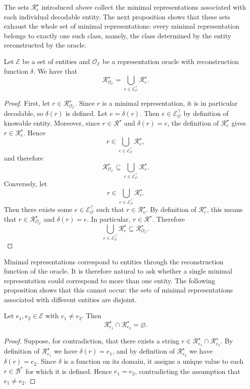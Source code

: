 The sets $\mathcal{R}^\star_{e}$ introduced above collect the minimal representations associated with each individual decodable entity. The next proposition shows that these sets exhaust the whole set of minimal representations: every minimal representation belongs to exactly one such class, namely, the class determined by the entity reconstructed by the oracle.

\begin{proposition}
Let $\mathcal{E}$ be a set of entities and $\mathcal{O}_\mathcal{E}$ be a representation oracle with reconstruction function $\delta$. We have that
\[
\mathcal{R}^{\star}_{\mathcal{O}_\mathcal{E}} = \bigcup_{e \in \mathcal{E}_{\mathcal{O}}^{\top}}\mathcal{R}^{\star}_{e}.
\]
\end{proposition}
\begin{proof}
First, let $r \in \mathcal{R}^{\star}_{\mathcal{O}_\mathcal{E}}$. Since $r$ is a minimal representation, it is in particular decodable, so $\delta(r)$ is defined. Let $e=\delta(r)$. Then $e\in\mathcal{E}_{\mathcal{O}}^{\top}$ by definition of knowable entity. Moreover, since $r \in \mathcal{R}^{\star}$ and $\delta(r)=e$, the definition of $\mathcal{R}^{\star}_{e}$ gives $r \in \mathcal{R}^{\star}_{e}$. Hence
\[
r\in \bigcup_{e\in\mathcal{E}_{\mathcal{O}}^{\top}}\mathcal{R}^{\star}_{e},
\]
and therefore
\[
\mathcal{R}^{\star}_{\mathcal{O}_\mathcal{E}} \subseteq \bigcup_{e\in\mathcal{E}_{\mathcal{O}}^{\top}}\mathcal{R}^{\star}_{e}.
\]
Conversely, let
\[
r\in \bigcup_{e\in\mathcal{E}_{\mathcal{O}}^{\top}}\mathcal{R}^{\star}_{e}.
\]
Then there exists some $e \in \mathcal{E}_{\mathcal{O}}^{\top}$ such that $r\in\mathcal{R}^{\star}_{e}$. By definition of $\mathcal{R}^{\star}_{e}$, this means that $r\in\mathcal{R}^{\star}_{\mathcal{O}_\mathcal{E}}$ and $\delta(r)=e$. In particular, $r\in\mathcal{R}^{\star}$. Therefore
\[
\bigcup_{e\in\mathcal{E}_{\mathcal{O}}^{\top}}\mathcal{R}^{\star}_{e}\subseteq \mathcal{R}^{\star}_{\mathcal{O}_\mathcal{E}}.
\]
\end{proof}

Minimal representations correspond to entities through the reconstruction function of the oracle. It is therefore natural to ask whether a single minimal representation could correspond to more than one entity. The following proposition shows that this cannot occur: the sets of minimal representations associated with different entities are disjoint.

\begin{proposition}
Let $e_1,e_2 \in \mathcal{E}$ with $e_1 \neq e_2$. Then
\[
\mathcal{R}^\star_{e_1} \cap \mathcal{R}^\star_{e_2} = \varnothing .
\]
\end{proposition}
\begin{proof}
Suppose, for contradiction, that there exists a string $r \in \mathcal{R}^\star_{e_1} \cap \mathcal{R}^\star_{e_2}$. By definition of $\mathcal{R}^\star_{e_1}$ we have $\delta(r)=e_1$, and by definition of $\mathcal{R}^\star_{e_2}$ we have $\delta(r)=e_2$. Since $\delta$ is a function on its domain, it assigns a unique value to each $r \in \mathcal{B}^\ast$ for which it is defined. Hence $e_1=e_2$, contradicting the assumption that $e_1 \neq e_2$.
\end{proof}

